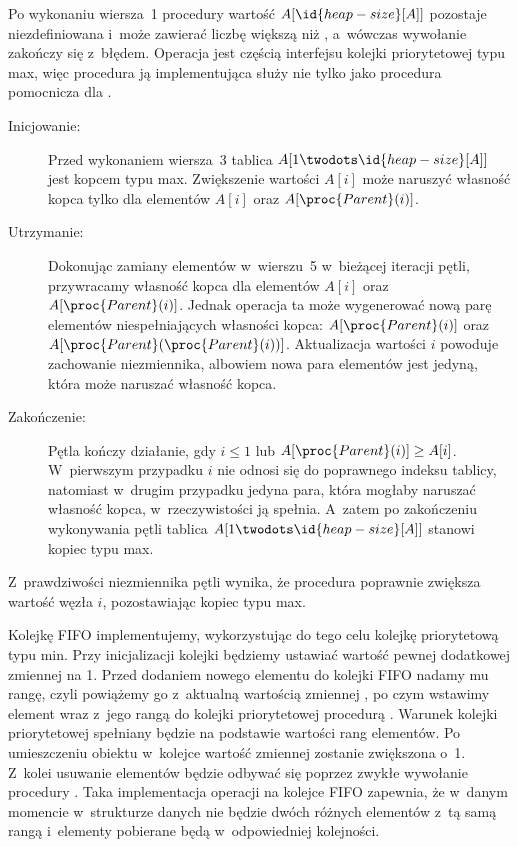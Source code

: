 \exercise %
Po wykonaniu wiersza~1 procedury  wartość $A[\id{heap-size}[A]]$ pozostaje niezdefiniowana i~może zawierać liczbę większą niż , a~wówczas wywołanie  zakończy się z~błędem. Operacja  jest częścią interfejsu kolejki priorytetowej typu max, więc procedura ją implementująca służy nie tylko jako procedura pomocnicza dla .

\exercise %
\begin{description}
	\item[Inicjowanie:] Przed wykonaniem wiersza~3 tablica $A[1\twodots\id{heap-size}[A]]$ jest kopcem typu max. Zwiększenie wartości $A[i]$ może naruszyć własność kopca tylko dla elementów $A[i]$ oraz $A[\proc{Parent}(i)]$.
	\item[Utrzymanie:] Dokonując zamiany elementów w~wierszu~5 w~bieżącej iteracji pętli, przywracamy własność kopca dla elementów $A[i]$ oraz $A[\proc{Parent}(i)]$. Jednak operacja ta może wygenerować nową parę elementów niespełniających własności kopca: $A[\proc{Parent}(i)]$ oraz $A[\proc{Parent}(\proc{Parent}(i))]$. Aktualizacja wartości $i$ powoduje zachowanie niezmiennika, albowiem nowa para elementów jest jedyną, która może naruszać własność kopca.
	\item[Zakończenie:] Pętla kończy działanie, gdy $i\le1$ lub $A[\proc{Parent}(i)]\ge A[i]$. W~pierwszym przypadku $i$ nie odnosi się do poprawnego indeksu tablicy, natomiast w~drugim przypadku jedyna para, która mogłaby naruszać własność kopca, w~rzeczywistości ją spełnia. A~zatem po zakończeniu wykonywania pętli tablica $A[1\twodots\id{heap-size}[A]]$ stanowi kopiec typu max.
\end{description}
Z~prawdziwości niezmiennika pętli wynika, że procedura  poprawnie zwiększa wartość węzła $i$, pozostawiając kopiec typu max.

\exercise %
Kolejkę FIFO implementujemy, wykorzystując do tego celu kolejkę priorytetową typu min. Przy inicjalizacji kolejki będziemy ustawiać wartość pewnej dodatkowej zmiennej  na 1. Przed dodaniem nowego elementu do kolejki FIFO nadamy mu rangę, czyli powiążemy go z~aktualną wartością zmiennej , po czym wstawimy element wraz z~jego rangą do kolejki priorytetowej procedurą . Warunek kolejki priorytetowej spełniany będzie na podstawie wartości rang elementów. Po umieszczeniu obiektu w~kolejce wartość zmiennej  zostanie zwiększona o~1. Z~kolei usuwanie elementów będzie odbywać się poprzez zwykłe wywołanie procedury . Taka implementacja operacji na kolejce FIFO zapewnia, że w~danym momencie w~strukturze danych nie będzie dwóch różnych elementów z~tą samą rangą i~elementy pobierane będą w~odpowiedniej kolejności.

